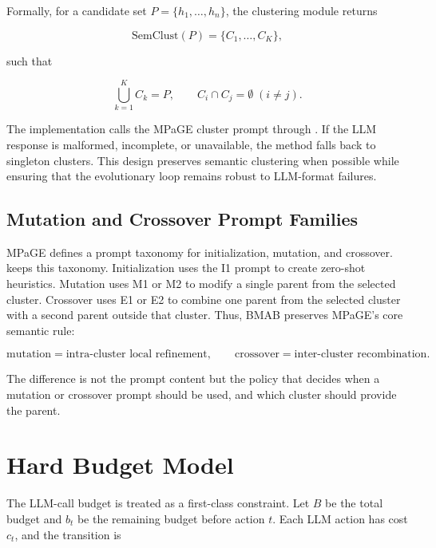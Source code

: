 Formally, for a candidate set $P=\{h_1,\ldots,h_n\}$, the clustering module returns

\begin{equation}
  \mathrm{SemClust}(P)=\{C_1,\ldots,C_K\},
\end{equation}

such that

\begin{equation}
  \bigcup_{k=1}^{K} C_k=P, \qquad C_i \cap C_j = \emptyset \; (i \ne j).
\end{equation}

The implementation calls the MPaGE cluster prompt through . If the LLM response is malformed, incomplete, or unavailable, the method falls back to singleton clusters. This design preserves semantic clustering when possible while ensuring that the evolutionary loop remains robust to LLM-format failures.

\subsection{Mutation and Crossover Prompt Families}

MPaGE defines a prompt taxonomy for initialization, mutation, and crossover. \bmab{} keeps this taxonomy. Initialization uses the I1 prompt to create zero-shot heuristics. Mutation uses M1 or M2 to modify a single parent from the selected cluster. Crossover uses E1 or E2 to combine one parent from the selected cluster with a second parent outside that cluster. Thus, BMAB preserves MPaGE's core semantic rule:

\begin{equation}
  \text{mutation} = \text{intra-cluster local refinement},
  \qquad
  \text{crossover} = \text{inter-cluster recombination}.
\end{equation}

The difference is not the prompt content but the policy that decides when a mutation or crossover prompt should be used, and which cluster should provide the parent.

\section{Hard Budget Model}

The LLM-call budget is treated as a first-class constraint. Let $B$ be the total budget and $b_t$ be the remaining budget before action $t$. Each LLM action has cost $c_t$, and the transition is

